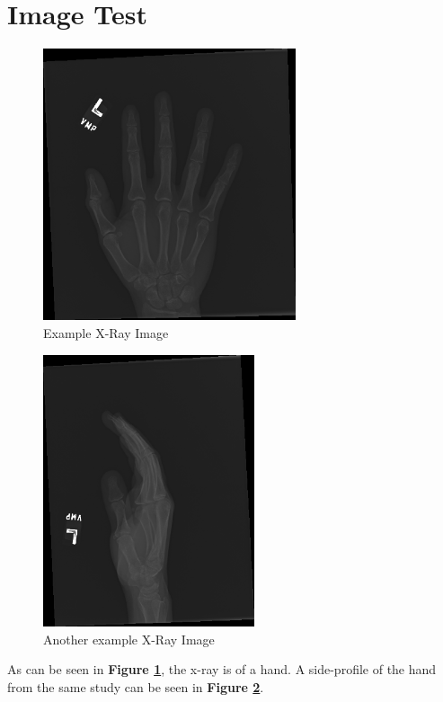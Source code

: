 \documentclass[11pt]{article} %
\theoremstyle{plain}
\theoremstyle{definition}
\begin{document}
\newpage
\section{Image Test}

\begin{figure}[!ht]
  \caption{Example X-Ray Image}
  \label{fig:xray1}
  \includegraphics[width=\textwidth, height=8cm]{image1}
  \centering
\end{figure}

\begin{figure}[!ht]
  \caption{Another example X-Ray Image}
  \label{fig:xray2}
  \includegraphics[width=\textwidth, height=8cm]{image2}
  \centering
\end{figure}

As can be seen in \textbf{Figure \ref{fig:xray1}}, the x-ray is of a hand. A side-profile of the hand from the same study can be seen in \textbf{Figure \ref{fig:xray2}}.

\clearpage


\end{document}
